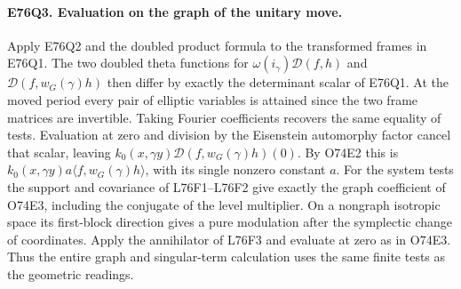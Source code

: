 
\paragraph{E76Q3. Evaluation on the graph of the unitary move.}
Apply E76Q2 and the doubled product formula to the transformed
frames in E76Q1. The two doubled theta functions for
$\omega(i_\gamma)\mathcal D(f,h)$ and
$\mathcal D(f,w_G(\gamma)h)$ then differ by exactly the determinant
scalar of E76Q1. At the moved period every pair of elliptic
variables is attained since the two frame matrices are invertible.
Taking Fourier coefficients recovers the same equality of tests.
Evaluation at zero and division by the Eisenstein automorphy
factor cancel that scalar, leaving
$k_0(x,\gamma y)\mathcal D(f,w_G(\gamma)h)(0)$. By O74E2 this is
$k_0(x,\gamma y)a\langle f,w_G(\gamma)h\rangle$, with its single
nonzero constant $a$. For the system tests the support and
covariance of L76F1--L76F2 give exactly the graph coefficient of
O74E3, including the conjugate of the level multiplier. On a
nongraph isotropic space its first-block direction gives a pure
modulation after the symplectic change of coordinates. Apply the
annihilator of L76F3 and evaluate at zero as in O74E3. Thus the
entire graph and singular-term calculation uses the same finite
tests as the geometric readings.
